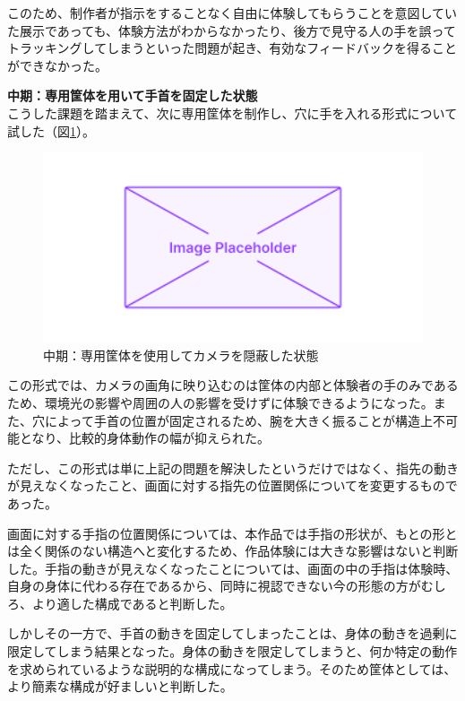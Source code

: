 このため、制作者が指示をすることなく自由に体験してもらうことを意図していた展示であっても、体験方法がわからなかったり、後方で見守る人の手を誤ってトラッキングしてしまうといった問題が起き、有効なフィードバックを得ることができなかった。

\textbf{中期：専用筐体を用いて手首を固定した状態}\\
こうした課題を踏まえて、次に専用筐体を制作し、穴に手を入れる形式について試した（図\ref{fig:kyotai_ver1}）。

\begin{figure}[H]
  \centering
  \includegraphics[width=15cm]{img/placeholder.png}
  \caption{中期：専用筐体を使用してカメラを隠蔽した状態}
  \label{fig:kyotai_ver1}
\end{figure}

この形式では、カメラの画角に映り込むのは筐体の内部と体験者の手のみであるため、環境光の影響や周囲の人の影響を受けずに体験できるようになった。また、穴によって手首の位置が固定されるため、腕を大きく振ることが構造上不可能となり、比較的身体動作の幅が抑えられた。

ただし、この形式は単に上記の問題を解決したというだけではなく、指先の動きが見えなくなったこと、画面に対する指先の位置関係についてを変更するものであった。

画面に対する手指の位置関係については、本作品では手指の形状が、もとの形とは全く関係のない構造へと変化するため、作品体験には大きな影響はないと判断した。手指の動きが見えなくなったことについては、画面の中の手指は体験時、自身の身体に代わる存在であるから、同時に視認できない今の形態の方がむしろ、より適した構成であると判断した。

しかしその一方で、手首の動きを固定してしまったことは、身体の動きを過剰に限定してしまう結果となった。身体の動きを限定してしまうと、何か特定の動作を求められているような説明的な構成になってしまう。そのため筐体としては、より簡素な構成が好ましいと判断した。


